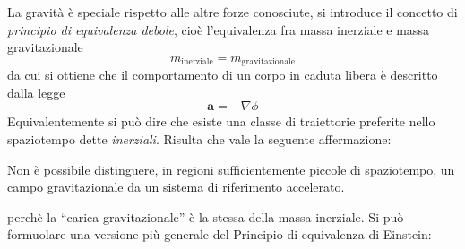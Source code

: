 \documentclass[twoside]{article}
\begin{document}
% 
% 

La gravità è speciale rispetto alle altre forze conosciute, si introduce il concetto di \emph{principio di equivalenza debole}, cioè l'equivalenza fra massa inerziale e massa gravitazionale
\begin{equation}
 m_{\textrm{inerziale}} = m_{\textrm{gravitazionale}}
\end{equation}
da cui si ottiene che il comportamento di un corpo in caduta libera è descritto dalla legge
\begin{equation}
 \mathbf{a} = -\nabla \phi
\end{equation}
Equivalentemente si può dire che esiste una classe di traiettorie preferite nello spaziotempo dette \emph{inerziali}. Risulta che vale la seguente affermazione:
\begin{textbf}
Non è possibile distinguere, in regioni sufficientemente piccole di spaziotempo, un campo gravitazionale da un sistema di riferimento accelerato.
\end{textbf}
perchè la ``carica gravitazionale'' è la stessa della massa inerziale.
Si può formuolare una versione più generale del Principio di equivalenza di Einstein:
\end{document}
